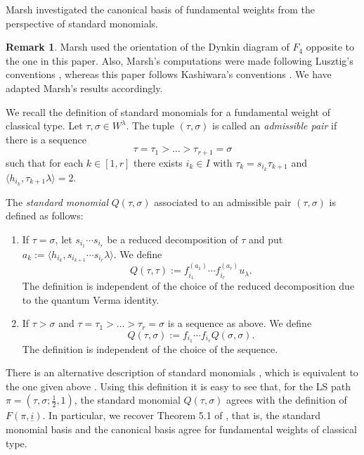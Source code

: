 \documentclass[final]{amsart}
\theoremstyle{plain}
\theoremstyle{definition}
\newtheorem{remark}[corollary]{Remark}
\newcommand{\uli}{{\underline i}}
\begin{document}
Marsh \cite{Marsh:CanonicalBasis-StandardMonomials} investigated the canonical basis of fundamental weights from the perspective of standard monomials.

\begin{remark}
    Marsh \cite{Marsh:CanonicalBasis-StandardMonomials} used the orientation of the Dynkin diagram of $F_4$ opposite to the one in this paper.
    Also, Marsh's computations were made following Lusztig's conventions \cite{Lusztig:IntroductionToQuantumGroups}, whereas this paper follows Kashiwara's conventions \cite{Kashiwara:CrystalBases-QuantizedUniversalEnvelopingAlgebras}.
    We have adapted Marsh's results accordingly.
\end{remark}

We recall the definition of standard monomials for a fundamental weight of classical type.
Let $\tau, \sigma \in W^\lambda$. The tuple $(\tau, \sigma)$ is called an \emph{admissible pair} if there is a sequence
\[
    \tau = \tau_1 > \dots > \tau_{r+1} = \sigma
\]
such that for each $k \in [1, r]$ there exists $i_k \in I$ with $\tau_k = s_{i_k}\tau_{k+1}$ and $\langle h_{i_k}, \tau_{k+1}\lambda\rangle = 2$.

The \emph{standard monomial} $Q(\tau, \sigma)$ associated to an admissible pair $(\tau, \sigma)$ is defined as follows:
\begin{enumerate}
    \item If $\tau = \sigma$, let $s_{i_1}\cdots s_{i_r}$ be a reduced decomposition of $\tau$ and put $a_k := \langle h_{i_k}, s_{i_{k+1}}\cdots s_{i_r}\lambda\rangle$.
    We define
    \[
        Q(\tau, \tau) := f_{i_1}^{(a_1)} \cdots f_{i_r}^{(a_r)} u_\lambda.
    \]
    The definition is independent of the choice of the reduced decomposition due to the quantum Verma identity.
    \item If $\tau > \sigma$ and $\tau = \tau_1 > \dots > \tau_r = \sigma$ is a sequence as above.
    We define
    \[
        Q(\tau, \sigma) := f_{i_1} \cdots f_{i_r} Q(\sigma, \sigma).
    \]
    The definition is independent of the choice of the sequence.
\end{enumerate}

There is an alternative description of standard monomials \cite[Definition 4.3]{Marsh:CanonicalBasis-StandardMonomials}, which is equivalent to the one given above \cite[Theorem 4.4]{Marsh:CanonicalBasis-StandardMonomials}.
Using this definition it is easy to see that, for the LS path $\pi = (\tau, \sigma; \frac12, 1)$, the standard monomial $Q(\tau, \sigma)$ agrees with the definition of $F(\pi, \uli)$.
In particular, we recover Theorem 5.1 of \cite{Marsh:CanonicalBasis-StandardMonomials}, that is, the standard monomial basis and the canonical basis agree for fundamental weights of classical type.
\end{document}
